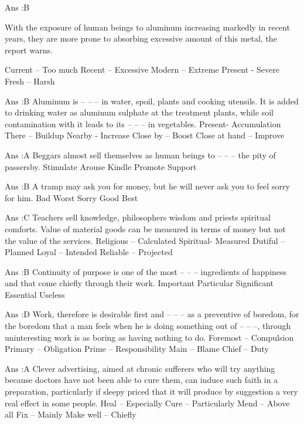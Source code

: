     Ans :B 



    With the exposure of human beings to aluminum increasing markedly in recent years, they are more prone to absorbing excessive amount of this metal, the report warns.

        Current – Too much
        Recent – Excessive
        Modern – Extreme
        Present - Severe
        Fresh – Harsh 

    Ans :B
    Aluminum is -- -- -- in water, spoil, plants and cooking utensils. It is added to drinking water as aluminum sulphate at the treatment plants, while soil contamination with it leads to its -- -- -- in vegetables.
        Present- Accumulation
        There – Buildup
        Nearby - Increase
        Close by – Boost
        Close at hand – Improve 

    Ans :A
    Beggars almost sell themselves as human beings to -- -- -- the pity of passersby.
        Stimulate
        Arouse
        Kindle
        Promote
        Support 

    Ans :B
    A tramp may ask you for money, but he will never ask you to feel sorry for him.
        Bad
        Worst
        Sorry
        Good
        Best 

    Ans :C
    Teachers sell knowledge, philosophers wisdom and priests spiritual comforts. Value of material goods can be measured in terms of money but not the value of the services.
        Religious – Calculated
        Spiritual- Measured
        Dutiful – Planned
        Loyal – Intended
        Reliable – Projected 

    Ans :B
    Continuity of purpose is one of the most -- -- -- ingredients of happiness and that come chiefly through their work.
        Important
        Particular
        Significant
        Essential
        Useless 

    Ans :D
    Work, therefore is desirable first and -- -- -- as a preventive of boredom, for the boredom that a man feels when he is doing something out of -- -- --, through uninteresting work is as boring as having nothing to do.
        Foremost – Compulsion
        Primary – Obligation
        Prime – Responsibility
        Main – Blame
        Chief – Duty 

    Ans :A
    Clever advertising, aimed at chronic sufferers who will try anything because doctors have not been able to cure them, can induce such faith in a preparation, particularly if sleepy priced that it will produce by suggestion a very real effect in some people.
        Heal – Especially
        Cure – Particularly
        Mend – Above all
        Fix – Mainly
        Make well – Chiefly 

